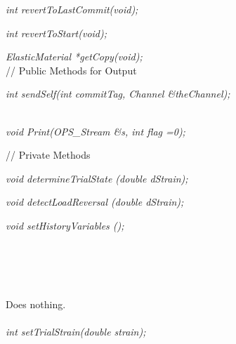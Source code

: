 {\em int revertToLastCommit(void); } 

{\em int revertToStart(void); } 

{\em ElasticMaterial *getCopy(void); } \\ 

// Public Methods for Output

{\em    int sendSelf(int commitTag, Channel \&theChannel); }

\\
{\em    void Print(OPS_Stream \&s, int flag =0);} 

// Private Methods 

{\em void determineTrialState (double dStrain); } 

{\em void detectLoadReversal (double dStrain); } 

{\em void setHistoryVariables (); } 


  \\
  \\

 \\
\\ 
Does nothing. \\

 \\
{\em int setTrialStrain(double strain); }  



